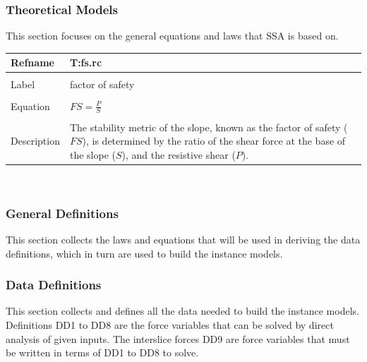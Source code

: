 \documentclass[12pt]{article}
\begin{document}
\subsubsection{Theoretical Models}
\label{Sec:TheoMode}
This section focuses on the general equations and laws that SSA is based on.
~\newline
\noindent \begin{minipage}{\textwidth}
\begin{tabular}{p{} p{}}
\toprule \textbf{Refname} & \textbf{T:fs.rc}
\label{T:fs.rc}
\\ \midrule \\
Label & factor of safety
\\ \midrule \\
Equation & $FS=\frac{P}{S}$
\\ \midrule \\
Description & The stability metric of the slope, known as the factor of safety ($FS$), is determined by the ratio of the shear force at the base of the slope ($S$), and the resistive shear ($P$).
\\ \bottomrule \end{tabular}
\end{minipage}\\
\subsubsection{General Definitions}
\label{Sec:GeneDefi}
This section collects the laws and equations that will be used in deriving the data definitions, which in turn are used to build the instance models.
\subsubsection{Data Definitions}
\label{Sec:DataDefi}
This section collects and defines all the data needed to build the instance models. Definitions DD1 to DD8 are the force variables that can be solved by direct analysis of given inputs. The interslice forces DD9 are force variables that must be written in terms of DD1 to DD8 to solve.
\end{document}
